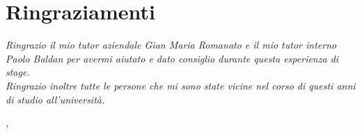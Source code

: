 
\cleardoublepage
{}
{}



\bigskip

\begingroup
\let\clearpage\relax
\let\cleardoublepage\relax
\let\cleardoublepage\relax

\chapter*{Ringraziamenti}

\noindent \textit{Ringrazio il mio tutor aziendale Gian Maria Romanato e il mio tutor interno Paolo Baldan per avermi aiutato e dato consiglio durante questa esperienza di stage.}\\

\noindent \textit{Ringrazio inoltre tutte le persone che mi sono state vicine nel corso di questi anni di studio all'università.}\\

\bigskip

\noindent\textit{\myLocation, \myTime}
\hfill \myName

\endgroup

